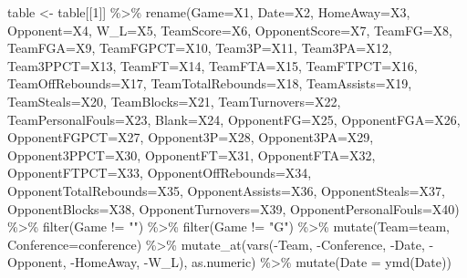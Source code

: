 \documentclass[
]{book}
\newenvironment{Shaded}{\begin{snugshade}}{\end{snugshade}}
\newcommand{\AttributeTok}[1]{\textcolor[rgb]{0.77,0.63,0.00}{#1}}
\newcommand{\DecValTok}[1]{\textcolor[rgb]{0.00,0.00,0.81}{#1}}
\newcommand{\FunctionTok}[1]{\textcolor[rgb]{0.00,0.00,0.00}{#1}}
\newcommand{\NormalTok}[1]{#1}
\newcommand{\OtherTok}[1]{\textcolor[rgb]{0.56,0.35,0.01}{#1}}
\newcommand{\SpecialCharTok}[1]{\textcolor[rgb]{0.00,0.00,0.00}{#1}}
\newcommand{\StringTok}[1]{\textcolor[rgb]{0.31,0.60,0.02}{#1}}
\begin{document}
\begin{Shaded}
\begin{Highlighting}[]
\NormalTok{table }\OtherTok{\textless{}{-}}\NormalTok{ table[[}\DecValTok{1}\NormalTok{]] }\SpecialCharTok{\%\textgreater{}\%} \FunctionTok{rename}\NormalTok{(}\AttributeTok{Game=}\NormalTok{X1, }\AttributeTok{Date=}\NormalTok{X2, }\AttributeTok{HomeAway=}\NormalTok{X3, }\AttributeTok{Opponent=}\NormalTok{X4, }\AttributeTok{W\_L=}\NormalTok{X5, }\AttributeTok{TeamScore=}\NormalTok{X6, }\AttributeTok{OpponentScore=}\NormalTok{X7, }\AttributeTok{TeamFG=}\NormalTok{X8, }\AttributeTok{TeamFGA=}\NormalTok{X9, }\AttributeTok{TeamFGPCT=}\NormalTok{X10, }\AttributeTok{Team3P=}\NormalTok{X11, }\AttributeTok{Team3PA=}\NormalTok{X12, }\AttributeTok{Team3PPCT=}\NormalTok{X13, }\AttributeTok{TeamFT=}\NormalTok{X14, }\AttributeTok{TeamFTA=}\NormalTok{X15, }\AttributeTok{TeamFTPCT=}\NormalTok{X16, }\AttributeTok{TeamOffRebounds=}\NormalTok{X17, }\AttributeTok{TeamTotalRebounds=}\NormalTok{X18, }\AttributeTok{TeamAssists=}\NormalTok{X19, }\AttributeTok{TeamSteals=}\NormalTok{X20, }\AttributeTok{TeamBlocks=}\NormalTok{X21, }\AttributeTok{TeamTurnovers=}\NormalTok{X22, }\AttributeTok{TeamPersonalFouls=}\NormalTok{X23, }\AttributeTok{Blank=}\NormalTok{X24, }\AttributeTok{OpponentFG=}\NormalTok{X25, }\AttributeTok{OpponentFGA=}\NormalTok{X26, }\AttributeTok{OpponentFGPCT=}\NormalTok{X27, }\AttributeTok{Opponent3P=}\NormalTok{X28, }\AttributeTok{Opponent3PA=}\NormalTok{X29, }\AttributeTok{Opponent3PPCT=}\NormalTok{X30, }\AttributeTok{OpponentFT=}\NormalTok{X31, }\AttributeTok{OpponentFTA=}\NormalTok{X32, }\AttributeTok{OpponentFTPCT=}\NormalTok{X33, }\AttributeTok{OpponentOffRebounds=}\NormalTok{X34, }\AttributeTok{OpponentTotalRebounds=}\NormalTok{X35, }\AttributeTok{OpponentAssists=}\NormalTok{X36, }\AttributeTok{OpponentSteals=}\NormalTok{X37, }\AttributeTok{OpponentBlocks=}\NormalTok{X38, }\AttributeTok{OpponentTurnovers=}\NormalTok{X39, }\AttributeTok{OpponentPersonalFouls=}\NormalTok{X40) }\SpecialCharTok{\%\textgreater{}\%} \FunctionTok{filter}\NormalTok{(Game }\SpecialCharTok{!=} \StringTok{""}\NormalTok{) }\SpecialCharTok{\%\textgreater{}\%} \FunctionTok{filter}\NormalTok{(Game }\SpecialCharTok{!=} \StringTok{"G"}\NormalTok{) }\SpecialCharTok{\%\textgreater{}\%} \FunctionTok{mutate}\NormalTok{(}\AttributeTok{Team=}\NormalTok{team, }\AttributeTok{Conference=}\NormalTok{conference) }\SpecialCharTok{\%\textgreater{}\%} \FunctionTok{mutate\_at}\NormalTok{(}\FunctionTok{vars}\NormalTok{(}\SpecialCharTok{{-}}\NormalTok{Team, }\SpecialCharTok{{-}}\NormalTok{Conference, }\SpecialCharTok{{-}}\NormalTok{Date, }\SpecialCharTok{{-}}\NormalTok{Opponent, }\SpecialCharTok{{-}}\NormalTok{HomeAway, }\SpecialCharTok{{-}}\NormalTok{W\_L), as.numeric) }\SpecialCharTok{\%\textgreater{}\%} \FunctionTok{mutate}\NormalTok{(}\AttributeTok{Date =} \FunctionTok{ymd}\NormalTok{(Date)) }
\end{Highlighting}
\end{Shaded}
\end{document}
